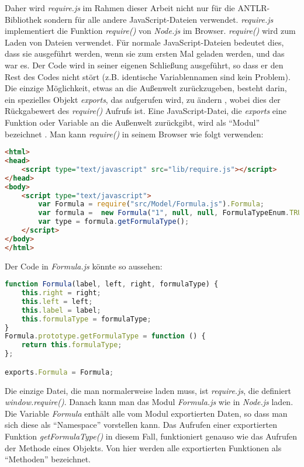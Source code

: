 Daher wird \textit{require.js} im Rahmen dieser Arbeit nicht nur für die ANTLR-Bibliothek sondern für alle andere JavaScript-Dateien verwendet. \textit{require.js} implementiert die Funktion \textit{require()} von \textit{Node.js} im Browser. \textit{require()} wird zum Laden von Dateien verwendet. Für normale JavaScript-Dateien bedeutet dies, dass sie ausgeführt werden, wenn sie zum ersten Mal geladen werden, und das war es. Der Code wird in seiner eigenen Schließung ausgeführt, so dass er den Rest des Codes nicht stört (z.B. identische Variablennamen sind kein Problem). Die einzige Möglichkeit, etwas an die Außenwelt zurückzugeben, besteht darin, ein spezielles Objekt \textit{exports}, das aufgerufen wird, zu ändern , wobei dies der Rückgabewert des\textit{ require()} Aufrufs ist. Eine JavaScript-Datei, die \textit{exports} eine Funktion oder Variable an die Außenwelt zurückgibt, wird als ``Modul'' bezeichnet \cite{pixels}. Man kann \textit{require()} in seinem Browser wie folgt verwenden:

\begin{lstlisting}[language=HTML,basicstyle=\scriptsize]
<html>
<head>
	<script type="text/javascript" src="lib/require.js"></script>
</head>
<body>
	<script type="text/javascript">
		var Formula = require("src/Model/Formula.js").Formula;
		var formula =  new Formula("1", null, null, FormulaTypeEnum.TRUE);
		var type = formula.getFormulaType();
	</script>
</body>
</html>
\end{lstlisting}
Der Code in \textit{Formula.js} könnte so aussehen:
\begin{lstlisting}[language=JavaScript,basicstyle=\scriptsize]
function Formula(label, left, right, formulaType) {
    this.right = right;
    this.left = left;
    this.label = label;
    this.formulaType = formulaType;
}
Formula.prototype.getFormulaType = function () {
    return this.formulaType;
};

exports.Formula = Formula;
\end{lstlisting}

Die einzige Datei, die man normalerweise laden muss, ist \textit{require.js}, die definiert \textit{window.require()}. Danach kann man das Modul \textit{Formula.js} wie in \textit{Node.js} laden. Die Variable \textit{Formula} enthält alle vom Modul exportierten Daten, so dass man sich diese als ``Namespace'' vorstellen kann. Das Aufrufen einer exportierten Funktion \textit{getFormulaType()} in diesem Fall, funktioniert genauso wie das Aufrufen der Methode eines Objekts. Von hier werden alle exportierten Funktionen als ``Methoden'' bezeichnet.

